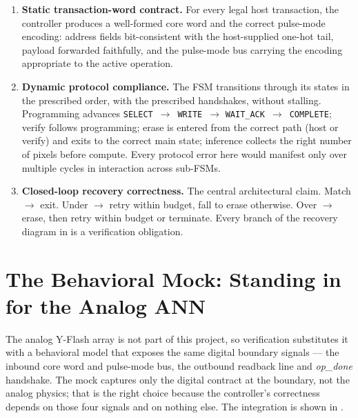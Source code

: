\begin{enumerate}
    \item \textbf{Static transaction-word contract.} For every legal
          host transaction, the controller produces a well-formed core
          word and the correct pulse-mode encoding: address fields
          bit-consistent with the host-supplied one-hot tail, payload
          forwarded faithfully, and the pulse-mode bus carrying the
          encoding appropriate to the active operation.
    \item \textbf{Dynamic protocol compliance.} The FSM transitions
          through its states in the prescribed order, with the
          prescribed handshakes, without stalling. Programming advances
          \texttt{SELECT}~$\rightarrow$~\texttt{WRITE}~$\rightarrow$
          \texttt{WAIT\_ACK}~$\rightarrow$~\texttt{COMPLETE}; verify
          follows programming; erase is entered from the correct path
          (host or verify) and exits to the correct main state;
          inference collects the right number of pixels before
          compute. Every protocol error here would manifest only over
          multiple cycles in interaction across sub-FSMs.
    \item \textbf{Closed-loop recovery correctness.} The central
          architectural claim. Match $\rightarrow$ exit. Under
          $\rightarrow$ retry within budget, fall to erase otherwise.
          Over $\rightarrow$ erase, then retry within budget or
          terminate. Every branch of the recovery diagram in
           is a verification
          obligation.
\end{enumerate}

\section{The Behavioral Mock: Standing in for the Analog ANN}
\label{sec:verif-mock-strategy}

The analog Y-Flash array is not part of this project, so verification
substitutes it with a behavioral model that exposes the same digital
boundary signals --- the inbound core word and pulse-mode bus, the
outbound readback line and \emph{op\_done} handshake. The mock captures
only the digital contract at the boundary, not the analog physics; that
is the right choice because the controller's correctness depends on those
four signals and on nothing else. The integration is shown in
.

